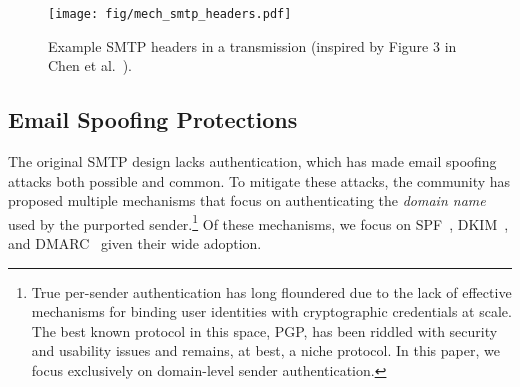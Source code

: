 



\begin{figure}[t]
    \centerline{\texttt{[image: fig/mech\_smtp\_headers.pdf]}}
    \centering
    \caption[Example SMTP Headers]{Example SMTP headers in a transmission (inspired by Figure 3 in Chen et al.~\cite{chen2020composition}).}
    \label{fig:mech_smtp_headers}
\end{figure}

\subsection{Email Spoofing Protections}
The original SMTP design lacks authentication, which
has made email spoofing attacks both possible and common. To mitigate these attacks, the community has proposed multiple mechanisms that focus on authenticating the \emph{domain name} used by the
purported sender.\footnote{True per-sender authentication has long floundered
  due to the lack of effective mechanisms for binding user identities
  with cryptographic credentials at scale.  The best known protocol in
  this space, PGP, has been riddled with security and usability issues
  and remains, at best, a niche protocol.  In this paper, we focus
  exclusively on domain-level sender authentication.} Of these
mechanisms, we focus on SPF~\cite{rfc7208}, DKIM~\cite{rfc6376}, and DMARC~\cite{rfc7489} given their wide adoption.

